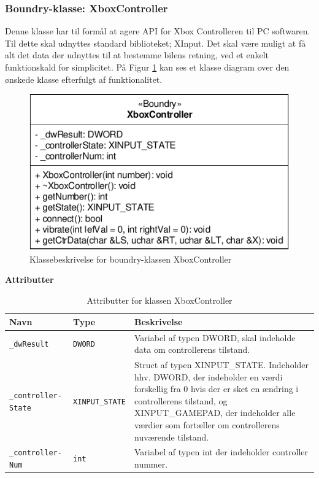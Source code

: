\subsubsection{Boundry-klasse: XboxController} \label{sec:swdesign_xboxcontroller}

Denne klasse har til formål at agere API for Xbox Controlleren til PC softwaren. Til dette skal udnyttes standard biblioteket; XInput. Det skal være muligt at få alt det data der udnyttes til at bestemme bilens retning, ved et enkelt funktionskald for simplicitet. På Figur \ref{fig:cd_xboxcontroller} kan ses et klasse diagram over den ønskede klasse efterfulgt af funktionalitet.

\begin{figure}[h]
\centering
\includegraphics[]{../fig/diagrammer/pc/cd_xboxcontroller.pdf}
\caption{Klassebeskrivelse for boundry-klassen XboxController}
\label{fig:cd_xboxcontroller}
\end{figure}

\textbf{Attributter}

\begin{table}[h]
\begin{tabularx}{\textwidth}{| Z | Z | L{10cm} |} \hline
Navn & Type & Beskrivelse \\\hline
\texttt{\_dwResult}				& \texttt{DWORD}		&Variabel af typen DWORD, skal indeholde data om controllerens tilstand.\\\hline

\texttt{\_controller- State}	& \texttt{XINPUT\_STATE}&Struct af typen XINPUT\_STATE. Indeholder hhv. DWORD, der indeholder en værdi forskellig fra 0 hvis der er sket en ændring i controllerens tilstand, og XINPUT\_GAMEPAD, der indeholder alle værdier som fortæller om controllerens nuværende tilstand.\\\hline

\texttt{\_controller- Num}		& \texttt{int}			&Variabel af typen int der indeholder controller nummer.\\\hline
\end{tabularx}
\caption{Attributter for klassen XboxController}
\label{table:attr_xboxcontroller}
\end{table}

